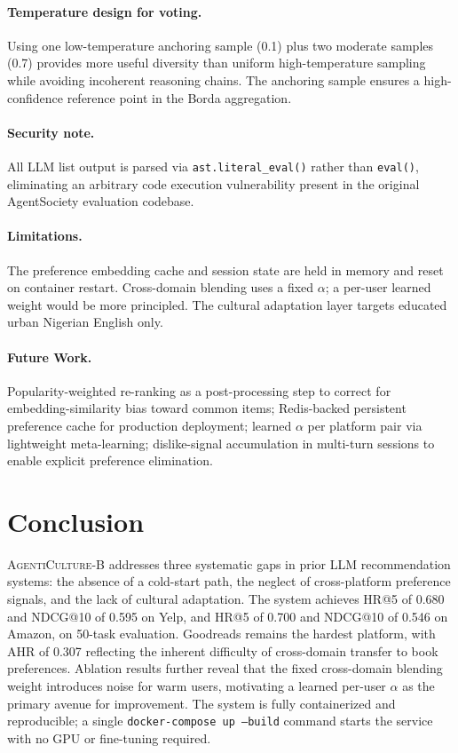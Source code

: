 \documentclass[11pt]{article}
\newcommand{\system}{\textsc{AgentiCulture}\xspace}
\begin{document}
\paragraph{Temperature design for voting.}
Using one low-temperature anchoring sample (0.1) plus two moderate samples
(0.7) provides more useful diversity than uniform high-temperature sampling
while avoiding incoherent reasoning chains.
The anchoring sample ensures a high-confidence reference point in the Borda
aggregation.

\paragraph{Security note.}
All LLM list output is parsed via \texttt{ast.literal\_eval()} rather than
\texttt{eval()}, eliminating an arbitrary code execution vulnerability present
in the original AgentSociety evaluation codebase.

\paragraph{Limitations.}
The preference embedding cache and session state are held in memory and reset
on container restart.
Cross-domain blending uses a fixed $\alpha$; a per-user learned weight would
be more principled.
The cultural adaptation layer targets educated urban Nigerian English only.

\paragraph{Future Work.}
Popularity-weighted re-ranking as a post-processing step to correct for
embedding-similarity bias toward common items;
Redis-backed persistent preference cache for production deployment;
learned $\alpha$ per platform pair via lightweight meta-learning;
dislike-signal accumulation in multi-turn sessions to enable explicit
preference elimination.

\section{Conclusion}

\system-B addresses three systematic gaps in prior LLM recommendation
systems: the absence of a cold-start path, the neglect of cross-platform
preference signals, and the lack of cultural adaptation.
The system achieves HR@5 of 0.680 and NDCG@10 of 0.595 on Yelp, and
HR@5 of 0.700 and NDCG@10 of 0.546 on Amazon, on 50-task evaluation.
Goodreads remains the hardest platform, with AHR of 0.307 reflecting
the inherent difficulty of cross-domain transfer to book preferences.
Ablation results further reveal that the fixed cross-domain blending weight
introduces noise for warm users, motivating a learned per-user $\alpha$
as the primary avenue for improvement.
The system is fully containerized and reproducible; a single
\texttt{docker-compose up --build} command starts the service with no GPU
or fine-tuning required.



\end{document}

